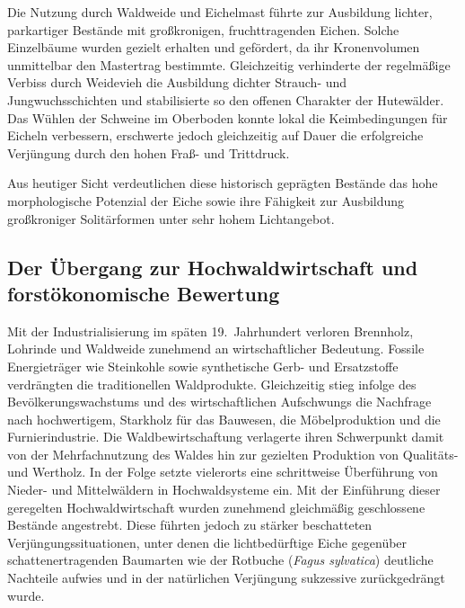 \documentclass[twocolumn, bibliography=totoc, abstract=true]{scrartcl}
\begin{document}
Die Nutzung durch Waldweide und Eichelmast führte zur Ausbildung lichter, parkartiger Bestände mit großkronigen, fruchttragenden Eichen. Solche Einzelbäume wurden gezielt erhalten und gefördert, da ihr Kronenvolumen unmittelbar den Mastertrag bestimmte. Gleichzeitig verhinderte der regelmäßige Verbiss durch Weidevieh die Ausbildung dichter Strauch- und Jungwuchsschichten und stabilisierte so den offenen Charakter der Hutewälder. Das Wühlen der Schweine im Oberboden konnte lokal die Keimbedingungen für Eicheln verbessern, erschwerte jedoch gleichzeitig auf Dauer die erfolgreiche Verjüngung durch den hohen Fraß- und Trittdruck.

Aus heutiger Sicht verdeutlichen diese historisch geprägten Bestände das hohe morphologische Potenzial der Eiche sowie ihre Fähigkeit zur Ausbildung großkroniger Solitärformen unter sehr hohem Lichtangebot.

\subsection{Der Übergang zur Hochwaldwirtschaft und forstökonomische Bewertung}

Mit der Industrialisierung im späten 19.~Jahrhundert verloren Brennholz, Lohrinde und Waldweide zunehmend an wirtschaftlicher Bedeutung. Fossile Energieträger wie Steinkohle sowie synthetische Gerb- und Ersatzstoffe verdrängten die traditionellen Waldprodukte. Gleichzeitig stieg infolge des Bevölkerungswachstums und des wirtschaftlichen Aufschwungs die Nachfrage nach hochwertigem, Starkholz für das Bauwesen, die Möbelproduktion und die Furnierindustrie. Die Waldbewirtschaftung verlagerte ihren Schwerpunkt damit von der Mehrfachnutzung des Waldes hin zur gezielten Produktion von Qualitäts- und Wertholz. In der Folge setzte vielerorts eine schrittweise Überführung von Nieder- und Mittelwäldern in Hochwaldsysteme ein. Mit der Einführung dieser geregelten Hochwaldwirtschaft wurden zunehmend gleichmäßig geschlossene Bestände angestrebt. Diese führten jedoch zu stärker beschatteten Verjüngungssituationen, unter denen die lichtbedürftige Eiche gegenüber schattenertragenden Baumarten wie der Rotbuche (\textit{Fagus sylvatica}) deutliche Nachteile aufwies und in der natürlichen Verjüngung sukzessive zurückgedrängt wurde.
\end{document}
